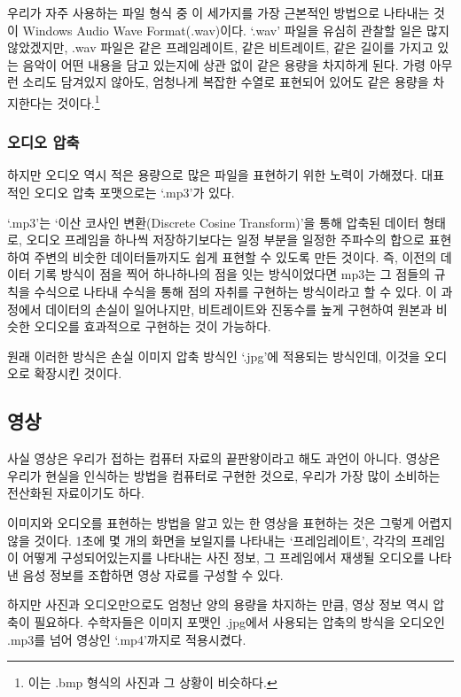 \documentclass{article}
\begin{document}
우리가 자주 사용하는 파일 형식 중 이 세가지를 가장 근본적인 방법으로 나타내는 것이
Windows Audio Wave Format(.wav)이다. `.wav' 파일을 유심히 관찰할 일은 많지 않았겠지만,
.wav 파일은 같은 프레임레이트, 같은 비트레이트, 같은 길이를 가지고 있는 음악이 어떤 내용을
담고 있는지에 상관 없이 같은 용량을 차지하게 된다.
가령 아무런 소리도 담겨있지 않아도, 엄청나게 복잡한 수열로 표현되어 있어도 같은 용량을 차지한다는
것이다.\footnote{이는 .bmp 형식의 사진과 그 상황이 비슷하다.}

\subsubsection{오디오 압축}

하지만 오디오 역시 적은 용량으로 많은 파일을 표현하기 위한 노력이 가해졌다.
대표적인 오디오 압축 포맷으로는 `.mp3'가 있다.

`.mp3'는 `이산 코사인 변환(Discrete Cosine Transform)'을 통해 압축된 데이터 형태로,
오디오 프레임을 하나씩 저장하기보다는 일정 부분을 일정한 주파수의 합으로 표현하여
주변의 비숫한 데이터들까지도 쉽게 표현할 수 있도록 만든 것이다.
즉, 이전의 데이터 기록 방식이 점을 찍어 하나하나의 점을 잇는 방식이었다면
mp3는 그 점들의 규칙을 수식으로 나타내 수식을 통해 점의 자취를 구현하는 방식이라고 할 수 있다.
이 과정에서 데이터의 손실이 일어나지만, 비트레이트와 진동수를 높게 구현하여
원본과 비슷한 오디오를 효과적으로 구현하는 것이 가능하다.

원래 이러한 방식은 손실 이미지 압축 방식인 `.jpg'에 적용되는 방식인데,
이것을 오디오로 확장시킨 것이다.

\subsection{영상}

사실 영상은 우리가 접하는 컴퓨터 자료의 끝판왕이라고 해도 과언이 아니다.
영상은 우리가 현실을 인식하는 방법을 컴퓨터로 구현한 것으로, 우리가 가장 많이 소비하는
전산화된 자료이기도 하다.

이미지와 오디오를 표현하는 방법을 알고 있는 한 영상을 표현하는 것은 그렇게 어렵지 않을 것이다.
1초에 몇 개의 화면을 보일지를 나타내는 `프레임레이트', 각각의 프레임이 어떻게 구성되어있는지를
나타내는 사진 정보, 그 프레임에서 재생될 오디오를 나타낸 음성 정보를 조합하면 영상 자료를
구성할 수 있다.

하지만 사진과 오디오만으로도 엄청난 양의 용량을 차지하는 만큼, 영상 정보 역시 압축이 필요하다.
수학자들은 이미지 포맷인 .jpg에서 사용되는 압축의 방식을 오디오인 .mp3를 넘어
영상인 `.mp4'까지로 적용시켰다.
\end{document}
